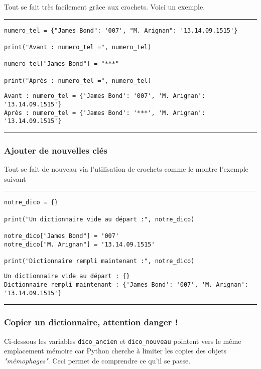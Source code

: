 Tout se fait très facilement grâce aux crochets. Voici un exemple.


\bigskip
{\hrule height .5mm}
\begin{verbatim}
numero_tel = {"James Bond": '007', "M. Arignan": '13.14.09.1515'}

print("Avant : numero_tel =", numero_tel)

numero_tel["James Bond"] = "***"

print("Après : numero_tel =", numero_tel)
\end{verbatim}
 \color{ForestGreen}
\vspace{-1.5em}
\begin{verbatim}
Avant : numero_tel = {'James Bond': '007', 'M. Arignan': '13.14.09.1515'}
Après : numero_tel = {'James Bond': '***', 'M. Arignan': '13.14.09.1515'}
\end{verbatim} \color{Black}
{\hrule height .5mm}
\bigskip


\subsubsection{Ajouter de nouvelles clés}

Tout se fait de nouveau via l'utilisation de crochets comme le montre l'exemple suivant


\bigskip
{\hrule height .5mm}
\begin{verbatim}
notre_dico = {}

print("Un dictionnaire vide au départ :", notre_dico)

notre_dico["James Bond"] = '007'
notre_dico["M. Arignan"] = '13.14.09.1515'

print("Dictionnaire rempli maintenant :", notre_dico)
\end{verbatim}
 \color{ForestGreen}
\vspace{-1.5em}
\begin{verbatim}
Un dictionnaire vide au départ : {}
Dictionnaire rempli maintenant : {'James Bond': '007', 'M. Arignan': '13.14.09.1515'}
\end{verbatim} \color{Black}
{\hrule height .5mm}
\bigskip


\subsubsection{Copier un dictionnaire, attention danger !}

Ci-dessous les variables \texttt{dico\_ancien} et \texttt{dico\_nouveau} pointent vers le même emplacement mémoire car Python cherche à limiter les copies des objets \textit{"mémophages"}. Ceci permet de comprendre ce qu'il se passe.



